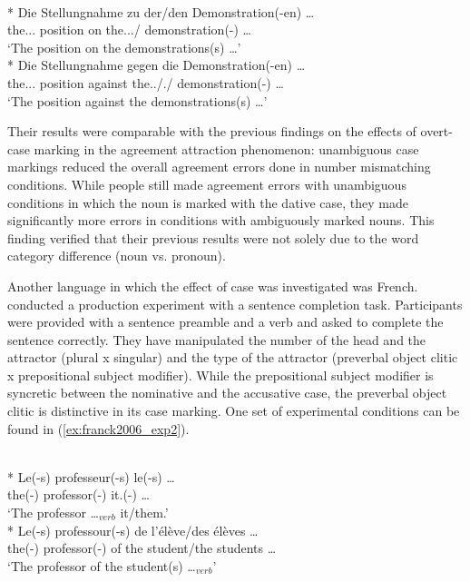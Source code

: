 \ea \label{ex:hart03}
  \\*
    \gll Die {Stellungnahme} zu der/den {Demonstration(-en)} \ldots{} \\
    the.\F.\Nom.\Sg{} position on the.\F.\Dat.\Sg/\Pl{} demonstration(-\Pl) \ldots{} \\
    \glt `The position on the demonstrations(s) \ldots{}'
  \\*
    \gll Die {Stellungnahme} gegen die {Demonstration(-en)} \ldots{} \\
    the.\F.\Nom.\Sg{} position against the.\F.\Nom/\Acc.\Sg/\Pl{} demonstration(-\Pl) \ldots{} \\
    \glt `The position against the demonstrations(s) \ldots{}'
  \z
\z

Their results were comparable with the previous findings on the effects of overt-case marking in the agreement attraction phenomenon: unambiguous case markings reduced the overall agreement errors done in number mismatching conditions. While people still made agreement errors with unambiguous conditions in which the noun is marked with the dative case, they made significantly more errors in conditions with ambiguously marked nouns. This finding verified that their previous results were not solely due to the word category difference (noun vs. pronoun).

Another language in which the effect of case was investigated was French.  conducted a production experiment with a sentence completion task. Participants were provided with a sentence preamble and a verb and asked to complete the sentence correctly. They have manipulated the number of the head and the attractor (plural x singular) and the type of the attractor (preverbal object clitic x prepositional subject modifier). While the prepositional subject modifier is syncretic between the nominative and the accusative case, the preverbal object clitic is distinctive in its case marking. One set of experimental conditions can be found in (\ref{ex:franck2006_exp2}).

\ea \label{ex:franck2006_exp2}
  \\*
  \gll Le(-s) {professeur(-s)} {le(-s)} \ldots{} \\
  the(-\Pl) professor(-\Pl) it.\Acc(-\Pl) \ldots{} \\
  \glt `The professor \ldots$_{verb}$ it/them.'
  \\*
  \gll Le(-s) {professour(-s)} {de l'\'el\`eve/des \'el\`eves} \ldots{} \\
  the(-\Pl) professor(-\Pl) {of the student/the students} \ldots{} \\
  \glt `The professor of the student(s) \ldots{}$_{verb}$'
  \z
\z

